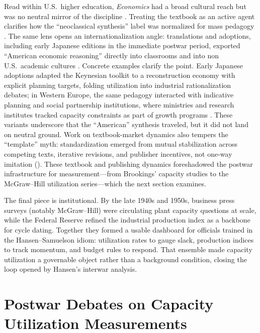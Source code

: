 \documentclass[11pt]{article}
\begin{document}
Read within U.S.\ higher education, \emph{Economics} had a broad cultural reach but was no neutral mirror of the discipline \citep{pearcehoover1995,colanderlandreth1996,colander2003}. Treating the textbook as an active agent clarifies how the ``neoclassical synthesis'' label was normalized for mass pedagogy \citep{devroey2004,backhouseboianovsky2016}. The same lens opens an internationalization angle: translations and adoptions, including early Japanese editions in the immediate postwar period, exported ``American economic reasoning'' directly into classrooms and into non U.S.\ academic cultures \citep{fourcade2009,giraud2018}. Concrete examples clarify the point. Early Japanese adoptions adapted the Keynesian toolkit to a reconstruction economy with explicit planning targets, folding utilization into industrial rationalization debates; in Western Europe, the same pedagogy interacted with indicative planning and social partnership institutions, where ministries and research institutes tracked capacity constraints as part of growth programs \citep{fourcade2009}. These variants underscore that the ``American'' synthesis traveled, but it did not land on neutral ground. Work on textbook-market dynamics also tempers the ``template'' myth: standardization emerged from mutual stabilization across competing texts, iterative revisions, and publisher incentives, not one-way imitation (\citealp{colander2003,giraud2018}). These textbook and publishing dynamics foreshadowed the postwar infrastructure for measurement---from Brookings' capacity studies to the McGraw--Hill utilization series---which the next section examines.

The final piece is institutional. By the late 1940s and 1950s, business press surveys (notably McGraw--Hill) were circulating plant capacity questions at scale, while the Federal Reserve refined the industrial production index as a backbone for cycle dating. Together they formed a usable dashboard for officials trained in the Hansen--Samuelson idiom: utilization rates to gauge slack, production indices to track momentum, and budget rules to respond. That ensemble made capacity utilization a governable object rather than a background condition, closing the loop opened by Hansen's interwar analysis.

\section{Postwar Debates on Capacity Utilization Measurements}
\end{document}

